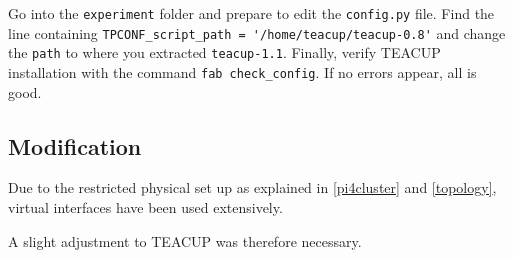 Go into the \lstinline{experiment} folder and prepare to edit the \lstinline{config.py} file. Find the line containing \lstinline{TPCONF_script_path = '/home/teacup/teacup-0.8'} and change the \lstinline{path} to where you extracted \lstinline{teacup-1.1}. Finally, verify TEACUP installation with the command \lstinline{fab check_config}. If no errors appear, all is good.


\subsection{Modification}

Due to the restricted physical set up as explained in \ref{pi4cluster} and \ref{topology}, virtual interfaces have been used extensively. 

A slight adjustment to TEACUP was therefore necessary.


